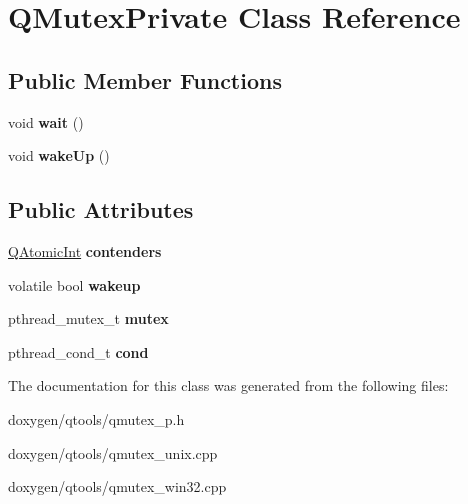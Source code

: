 \hypertarget{class_q_mutex_private}{}\section{Q\+Mutex\+Private Class Reference}
\label{class_q_mutex_private}
\subsection*{Public Member Functions}
\begin{DoxyCompactItemize}
\item 
\mbox{\label{class_q_mutex_private_a28563c090da051f5162ef1a109b2a07b}} 
void {\bfseries wait} ()
\item 
\mbox{\label{class_q_mutex_private_ae3a1d392a534d8bd323428b1b0e80b8f}} 
void {\bfseries wake\+Up} ()
\end{DoxyCompactItemize}
\subsection*{Public Attributes}
\begin{DoxyCompactItemize}
\item 
\mbox{\label{class_q_mutex_private_a4ac3e54a95eed7cc3b0f9a1bc80e34f1}} 
\mbox{\hyperlink{class_q_atomic_int}{Q\+Atomic\+Int}} {\bfseries contenders}
\item 
\mbox{\label{class_q_mutex_private_acae53ac5787f6fe69be1321d069f5f7d}} 
volatile bool {\bfseries wakeup}
\item 
\mbox{\label{class_q_mutex_private_acd3490bc71fdb04de75a7055b1211def}} 
pthread\+\_\+mutex\+\_\+t {\bfseries mutex}
\item 
\mbox{\label{class_q_mutex_private_a58da8d570849a70617e6f87d2945f639}} 
pthread\+\_\+cond\+\_\+t {\bfseries cond}
\end{DoxyCompactItemize}


The documentation for this class was generated from the following files\+:\begin{DoxyCompactItemize}
\item 
doxygen/qtools/qmutex\+\_\+p.\+h\item 
doxygen/qtools/qmutex\+\_\+unix.\+cpp\item 
doxygen/qtools/qmutex\+\_\+win32.\+cpp\end{DoxyCompactItemize}
